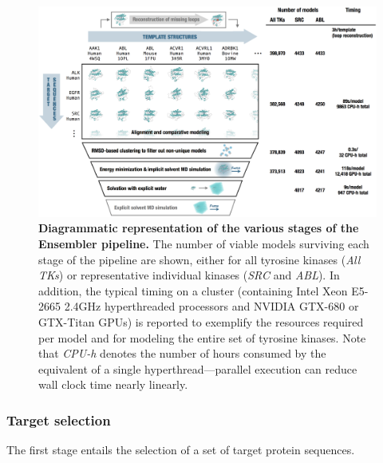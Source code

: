 \documentclass[aps,pre,twocolumn,nofootinbib,superscriptaddress,linenumbers]{revtex4-1}
\begin{document}
\begin{figure}[tb]
  \centering
    \includegraphics[width=1.0\textwidth]{pipeline/pipeline2}
  \caption{{\bf Diagrammatic representation of the various stages of the Ensembler pipeline.}
  The number of viable models surviving each stage of the pipeline are shown, either for all tyrosine kinases (\emph{All TKs}) or representative individual kinases (\emph{SRC} and \emph{ABL}).
  In addition, the typical timing on a cluster (containing Intel Xeon E5-2665 2.4GHz hyperthreaded processors and NVIDIA GTX-680 or GTX-Titan GPUs) is reported to exemplify the resources required per model and for modeling the entire set of tyrosine kinases.
  Note that \emph{CPU-h} denotes the number of hours consumed by the equivalent of a single hyperthread---parallel execution can reduce wall clock time nearly linearly.
  }
  \label{figpipeline}
\end{figure}

\subsubsection{Target selection}

The first stage entails the selection of a set of target protein sequences.
\end{document}

